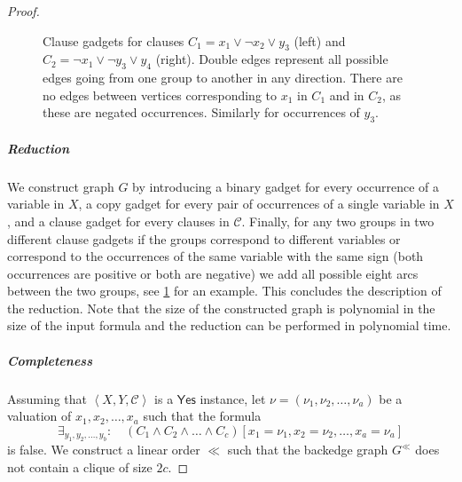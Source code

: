 \documentclass[a4paper,USenglish,cleveref,autoref,thm-restate,pdfa]{lipics-v2021}
\newcommand{\abrac}[1]{\left\langle#1\right\rangle}
\begin{document}
\begin{proof}
\begin{figure}
\begin{center}
\begin{tiny}
\end{tiny}
\end{center}
    \caption{\label{fig:clause_gadget} Clause gadgets for clauses $C_1 = x_1 \vee \neg x_2 \vee y_3$ (left) and $C_2 = \neg x_1 \vee \neg y_3 \vee y_4$ (right).
    Double edges represent all possible edges going from one group to another in any direction.
    There are no edges between vertices corresponding to $x_1$ in $C_1$ and in $C_2$, as these are negated occurrences.
    Similarly for occurrences of $y_3$.
    }
\end{figure}

    \subparagraph*{Reduction}
    We construct graph $G$ by introducing a binary gadget for every occurrence of a variable in $X$, a copy gadget for every pair of occurrences of a single variable in $X$, and a clause gadget for every clauses in $\mathcal{C}$.
    Finally, for any two groups in two different clause gadgets if the groups correspond to different variables or correspond to the occurrences of the same variable with the same sign (both occurrences are positive or both are negative) we add all possible eight arcs between the two groups, see \cref{fig:clause_gadget} for an example.
    This concludes the description of the reduction.
    Note that 
    the size of the constructed graph is polynomial in the size of the input formula
    and the reduction can be performed in polynomial time. 

    \subparagraph*{Completeness}
    Assuming that $\abrac{X,Y,\mathcal{C}}$ is a $\mathsf{Yes}$ instance, 
    let $\nu=(\nu_1,\nu_2,\ldots,\nu_a)$ be a valuation of $x_1,x_2,\ldots,x_a$ such that the formula $$\exists_{y_1,y_2,\ldots,y_b}:\quad (C_1 \wedge C_2 \wedge \ldots \wedge C_c)[x_1=\nu_1,x_2=\nu_2,\ldots,x_a=\nu_a]$$ is false.
    We construct a linear order \(\ll\) such that the backedge graph \(G^{\ll}\) does not contain a clique of size \(2c\).


\end{proof}
\end{document}
